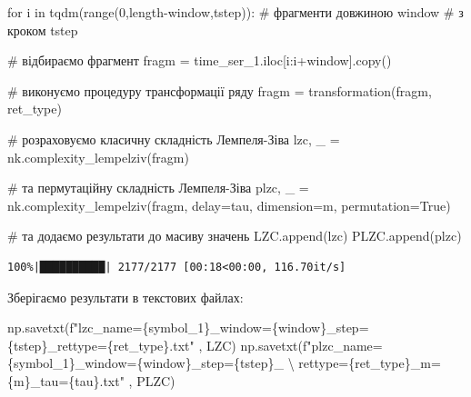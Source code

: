 \documentclass[
  letterpaper,
]{report}
\newenvironment{Shaded}{\begin{snugshade}}{\end{snugshade}}
\newcommand{\BuiltInTok}[1]{\textcolor[rgb]{0.00,0.23,0.31}{#1}}
\newcommand{\CharTok}[1]{\textcolor[rgb]{0.13,0.47,0.30}{#1}}
\newcommand{\CommentTok}[1]{\textcolor[rgb]{0.37,0.37,0.37}{#1}}
\newcommand{\ControlFlowTok}[1]{\textcolor[rgb]{0.00,0.23,0.31}{#1}}
\newcommand{\DecValTok}[1]{\textcolor[rgb]{0.68,0.00,0.00}{#1}}
\newcommand{\KeywordTok}[1]{\textcolor[rgb]{0.00,0.23,0.31}{#1}}
\newcommand{\NormalTok}[1]{\textcolor[rgb]{0.00,0.23,0.31}{#1}}
\newcommand{\OperatorTok}[1]{\textcolor[rgb]{0.37,0.37,0.37}{#1}}
\newcommand{\SpecialCharTok}[1]{\textcolor[rgb]{0.37,0.37,0.37}{#1}}
\newcommand{\SpecialStringTok}[1]{\textcolor[rgb]{0.13,0.47,0.30}{#1}}
\newcommand{\VariableTok}[1]{\textcolor[rgb]{0.07,0.07,0.07}{#1}}
\begin{document}
\begin{Shaded}
\begin{Highlighting}[]
\ControlFlowTok{for}\NormalTok{ i }\KeywordTok{in}\NormalTok{ tqdm(}\BuiltInTok{range}\NormalTok{(}\DecValTok{0}\NormalTok{,length}\OperatorTok{{-}}\NormalTok{window,tstep)):    }\CommentTok{\# фрагменти довжиною window  }
                                                \CommentTok{\# з кроком tstep}

    \CommentTok{\# відбираємо фрагмент}
\NormalTok{    fragm }\OperatorTok{=}\NormalTok{ time\_ser\_1.iloc[i:i}\OperatorTok{+}\NormalTok{window].copy()   }

    \CommentTok{\# виконуємо процедуру трансформації ряду }
\NormalTok{    fragm }\OperatorTok{=}\NormalTok{ transformation(fragm, ret\_type)}

    \CommentTok{\# розраховуємо класичну складність Лемпеля{-}Зіва }
\NormalTok{    lzc, \_ }\OperatorTok{=}\NormalTok{ nk.complexity\_lempelziv(fragm)}

    \CommentTok{\# та пермутаційну складність Лемпеля{-}Зіва}
\NormalTok{    plzc, \_ }\OperatorTok{=}\NormalTok{ nk.complexity\_lempelziv(fragm, }
\NormalTok{                                      delay}\OperatorTok{=}\NormalTok{tau, }
\NormalTok{                                      dimension}\OperatorTok{=}\NormalTok{m, }
\NormalTok{                                      permutation}\OperatorTok{=}\VariableTok{True}\NormalTok{)}


    \CommentTok{\# та додаємо результати до масиву значень}
\NormalTok{    LZC.append(lzc)}
\NormalTok{    PLZC.append(plzc)}
\end{Highlighting}
\end{Shaded}

\begin{verbatim}
100%|██████████| 2177/2177 [00:18<00:00, 116.70it/s]
\end{verbatim}

Зберігаємо результати в текстових файлах:

\begin{Shaded}
\begin{Highlighting}[]
\NormalTok{np.savetxt(}\SpecialStringTok{f"lzc\_name=}\SpecialCharTok{\{}\NormalTok{symbol\_1}\SpecialCharTok{\}}\SpecialStringTok{\_window=}\SpecialCharTok{\{}\NormalTok{window}\SpecialCharTok{\}}\SpecialStringTok{\_step=}\SpecialCharTok{\{}\NormalTok{tstep}\SpecialCharTok{\}}\SpecialStringTok{\_rettype=}\SpecialCharTok{\{}\NormalTok{ret\_type}\SpecialCharTok{\}}\SpecialStringTok{.txt"}\NormalTok{ , LZC)}
\NormalTok{np.savetxt(}\SpecialStringTok{f"plzc\_name=}\SpecialCharTok{\{}\NormalTok{symbol\_1}\SpecialCharTok{\}}\SpecialStringTok{\_window=}\SpecialCharTok{\{}\NormalTok{window}\SpecialCharTok{\}}\SpecialStringTok{\_step=}\SpecialCharTok{\{}\NormalTok{tstep}\SpecialCharTok{\}}\SpecialStringTok{\_ }\CharTok{\textbackslash{}}
\SpecialStringTok{    rettype=}\SpecialCharTok{\{}\NormalTok{ret\_type}\SpecialCharTok{\}}\SpecialStringTok{\_m=}\SpecialCharTok{\{}\NormalTok{m}\SpecialCharTok{\}}\SpecialStringTok{\_tau=}\SpecialCharTok{\{}\NormalTok{tau}\SpecialCharTok{\}}\SpecialStringTok{.txt"}\NormalTok{ , PLZC)}
\end{Highlighting}
\end{Shaded}
\end{document}
